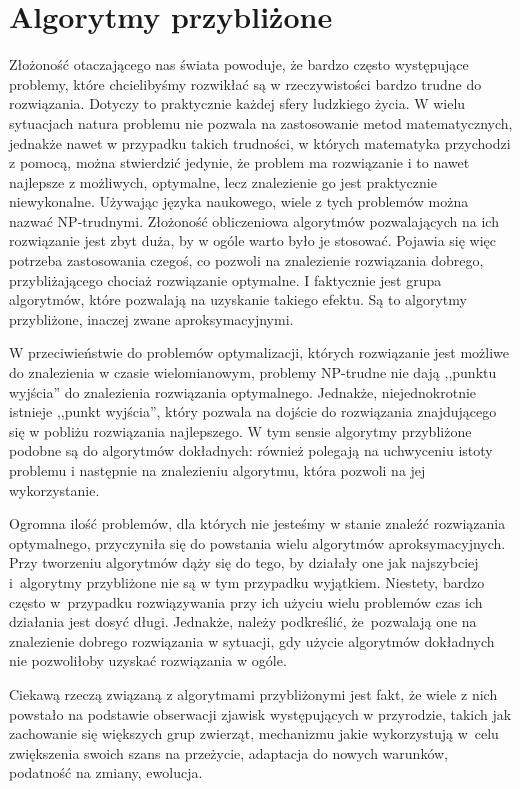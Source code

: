 \chapter{Algorytmy przybliżone}
\label{cha:algorytmy}

Złożoność otaczającego nas świata powoduje, że bardzo często występujące problemy, które chcielibyśmy rozwikłać są w rzeczywistości bardzo trudne do rozwiązania. Dotyczy to praktycznie każdej sfery ludzkiego życia. W wielu sytuacjach natura problemu nie pozwala na zastosowanie metod matematycznych, jednakże nawet w przypadku takich trudności, w których matematyka przychodzi z pomocą, można stwierdzić jedynie, że problem ma rozwiązanie i to nawet najlepsze z możliwych, optymalne, lecz znalezienie go jest praktycznie niewykonalne. Używając języka naukowego, wiele z tych problemów można nazwać NP-trudnymi. Złożoność obliczeniowa algorytmów pozwalających na ich  rozwiązanie jest zbyt duża, by w ogóle warto było je stosować. Pojawia się więc potrzeba zastosowania czegoś, co pozwoli na znalezienie rozwiązania dobrego, przybliżającego chociaż rozwiązanie optymalne. I faktycznie jest grupa algorytmów, które pozwalają na uzyskanie takiego efektu. Są to algorytmy przybliżone, inaczej zwane aproksymacyjnymi.

W przeciwieństwie do problemów optymalizacji, których rozwiązanie jest możliwe do znalezienia w czasie wielomianowym, problemy NP-trudne nie dają ,,punktu wyjścia'' do znalezienia rozwiązania optymalnego. Jednakże, niejednokrotnie istnieje ,,punkt wyjścia'', który pozwala na dojście do rozwiązania znajdującego się w pobliżu rozwiązania najlepszego. W tym sensie algorytmy przybliżone podobne są do algorytmów dokładnych: również polegają na uchwyceniu istoty problemu i następnie na znalezieniu algorytmu, która pozwoli na jej  wykorzystanie.

Ogromna ilość problemów, dla których nie jesteśmy w stanie znaleźć rozwiązania optymalnego, przyczyniła się do powstania wielu algorytmów aproksymacyjnych.  Przy tworzeniu algorytmów dąży się do tego, by działały one jak najszybciej i~algorytmy przybliżone nie są w tym przypadku wyjątkiem. Niestety, bardzo często w~przypadku rozwiązywania przy ich użyciu wielu problemów czas ich działania jest dosyć długi. Jednakże, należy podkreślić, że~pozwalają one na znalezienie dobrego rozwiązania w sytuacji, gdy użycie algorytmów dokładnych nie pozwoliłoby uzyskać rozwiązania w ogóle.

Ciekawą rzeczą związaną z algorytmami przybliżonymi jest fakt, że wiele z nich powstało na podstawie obserwacji zjawisk występujących w przyrodzie, takich jak zachowanie się większych grup zwierząt, mechanizmu jakie wykorzystują w~celu zwiększenia swoich szans na przeżycie, adaptacja do nowych warunków, podatność na zmiany, ewolucja.

